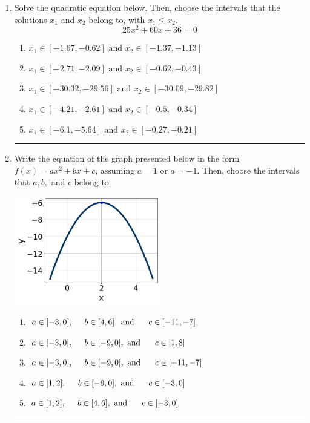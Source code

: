 \documentclass[14pt]{extbook}
\newcommand{\litem}[1]{\item#1\hspace*{-1cm}\rule{\textwidth}{0.4pt}}
\begin{document}
\begin{enumerate}
\litem{
Solve the quadratic equation below. Then, choose the intervals that the solutions $x_1$ and $x_2$ belong to, with $x_1 \leq x_2$.\[ 25x^{2} +60 x + 36 = 0 \]\begin{enumerate}[label=\Alph*.]
\item \( x_1 \in [-1.67, -0.62] \text{ and } x_2 \in [-1.37, -1.13] \)
\item \( x_1 \in [-2.71, -2.09] \text{ and } x_2 \in [-0.62, -0.43] \)
\item \( x_1 \in [-30.32, -29.56] \text{ and } x_2 \in [-30.09, -29.82] \)
\item \( x_1 \in [-4.21, -2.61] \text{ and } x_2 \in [-0.5, -0.34] \)
\item \( x_1 \in [-6.1, -5.64] \text{ and } x_2 \in [-0.27, -0.21] \)

\end{enumerate} }
\litem{
Write the equation of the graph presented below in the form $f(x)=ax^2+bx+c$, assuming  $a=1$ or $a=-1$. Then, choose the intervals that $a, b,$ and $c$ belong to.
\begin{center}
    \includegraphics[width=0.5\textwidth]{../Figures/quadraticGraphToEquationA.png}
\end{center}
\begin{enumerate}[label=\Alph*.]
\item \( a \in [-3, 0], \hspace*{5mm} b \in [4, 6], \text{ and } \hspace*{5mm} c \in [-11, -7] \)
\item \( a \in [-3, 0], \hspace*{5mm} b \in [-9, 0], \text{ and } \hspace*{5mm} c \in [1, 8] \)
\item \( a \in [-3, 0], \hspace*{5mm} b \in [-9, 0], \text{ and } \hspace*{5mm} c \in [-11, -7] \)
\item \( a \in [1, 2], \hspace*{5mm} b \in [-9, 0], \text{ and } \hspace*{5mm} c \in [-3, 0] \)
\item \( a \in [1, 2], \hspace*{5mm} b \in [4, 6], \text{ and } \hspace*{5mm} c \in [-3, 0] \)


\end{enumerate}}
\end{enumerate}
\end{document}
